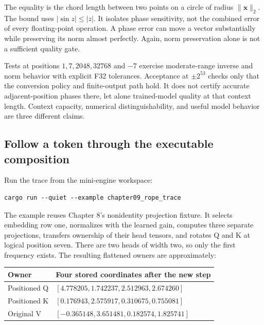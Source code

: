 \documentclass[
  10pt,
]{article}
\newcounter{none} %
\begin{document}
The equality is the chord length between two points on a circle of
radius \(\|\mathbf{x}\|_2\). The bound uses \(|\sin z|\le|z|\). It
isolates phase sensitivity, not the combined error of every
floating-point operation. A phase error can move a vector substantially
while preserving its norm almost perfectly. Again, norm preservation
alone is not a sufficient quality gate.

Tests at positions \(1,7,2048,32768\) and \(-7\) exercise moderate-range
inverse and norm behavior with explicit F32 tolerances. Acceptance at
\(\pm2^{53}\) checks only that the conversion policy and finite-output
path hold. It does not certify accurate adjacent-position phases there,
let alone trained-model quality at that context length. Context
capacity, numerical distinguishability, and useful model behavior are
three different claims.

\subsection{Follow a token through the executable
composition}\label{follow-a-token-through-the-executable-composition}

Run the trace from the mini-engine workspace:

\begin{verbatim}
cargo run --quiet --example chapter09_rope_trace
\end{verbatim}

The example reuses Chapter 8's nonidentity projection fixture. It
selects embedding row one, normalizes with the learned gain, computes
three separate projections, transfers ownership of their head tensors,
and rotates Q and K at logical position seven. There are two heads of
width two, so only the first frequency exists. The resulting flattened
owners are approximately:

{\def\LTcaptype{none} %
\begin{longtable}[]{@{}ll@{}}
\toprule\noalign{}
Owner & Four stored coordinates after the new step \\
\midrule\noalign{}
\endhead
\bottomrule\noalign{}
\endlastfoot
Positioned Q & \([4.778205,1.742237,2.512963,2.674260]\) \\
Positioned K & \([0.176943,2.575917,0.310675,0.755081]\) \\
Original V & \([-0.365148,3.651481,0.182574,1.825741]\) \\
\end{longtable}
}
\end{document}

